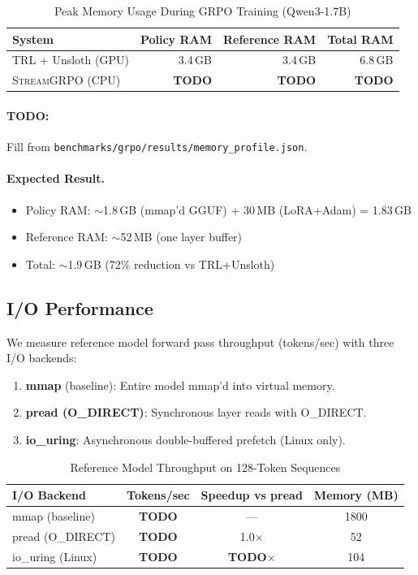 \documentclass[sigconf,review,anonymous]{acmart}
\begin{document}
\begin{table}[h]
\centering
\caption{Peak Memory Usage During GRPO Training (Qwen3-1.7B)}
\label{tab:memory}
\begin{tabular}{lrrr}
\toprule
\textbf{System} & \textbf{Policy RAM} & \textbf{Reference RAM} & \textbf{Total RAM} \\
\midrule
TRL + Unsloth (GPU) & 3.4\,GB & 3.4\,GB & 6.8\,GB \\
\textsc{StreamGRPO} (CPU) & \textbf{TODO} & \textbf{TODO} & \textbf{TODO} \\
\bottomrule
\end{tabular}
\end{table}

\paragraph{TODO:} Fill from \texttt{benchmarks/grpo/results/memory\_profile.json}.

\paragraph{Expected Result.}
\begin{itemize}
\item Policy RAM: $\sim$1.8\,GB (mmap'd GGUF) + 30\,MB (LoRA+Adam) = 1.83\,GB
\item Reference RAM: $\sim$52\,MB (one layer buffer)
\item Total: $\sim$1.9\,GB (72\% reduction vs TRL+Unsloth)
\end{itemize}

\subsection{I/O Performance}
\label{sec:eval:io}

We measure reference model forward pass throughput (tokens/sec) with three I/O backends:
\begin{enumerate}
\item \textbf{mmap} (baseline): Entire model mmap'd into virtual memory.
\item \textbf{pread (O\_DIRECT)}: Synchronous layer reads with O\_DIRECT.
\item \textbf{io\_uring}: Asynchronous double-buffered prefetch (Linux only).
\end{enumerate}

\begin{table}[h]
\centering
\caption{Reference Model Throughput on 128-Token Sequences}
\label{tab:io}
\begin{tabular}{lccc}
\toprule
\textbf{I/O Backend} & \textbf{Tokens/sec} & \textbf{Speedup vs pread} & \textbf{Memory (MB)} \\
\midrule
mmap (baseline) & \textbf{TODO} & --- & 1800 \\
pread (O\_DIRECT) & \textbf{TODO} & 1.0$\times$ & 52 \\
io\_uring (Linux) & \textbf{TODO} & \textbf{TODO}$\times$ & 104 \\
\bottomrule
\end{tabular}
\end{table}
\end{document}
